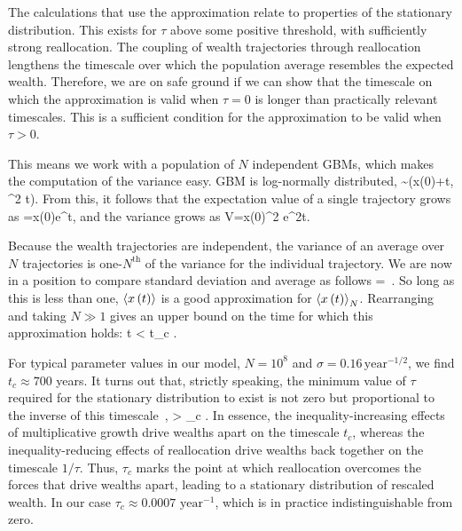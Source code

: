 The calculations that use the approximation relate to properties of the stationary distribution. This exists for $\tau$ above some positive threshold, \ie with sufficiently strong reallocation. The coupling of wealth trajectories through reallocation lengthens the timescale over which the population average resembles the expected wealth. Therefore, we are on safe ground if we can show that the timescale on which the approximation is valid when $\tau=0$ is longer than practically relevant timescales. This is a sufficient condition for the approximation to be valid when $\tau>0$.

This means we work with a population of $N$ independent GBMs, which makes the computation of the variance easy. GBM is log-normally distributed,
\be
\ln{}\sim \ln{}\ln\left(x\left(0\right)+ t, \sigma^2 t\right).
\ee
From this, it follows that the expectation value of a single trajectory grows as
\be
{}=x\left(0\right)e^{\mu t},
\ee
and the variance grows as
\be
V=x\left(0\right)^2 e^{2\mu t}.
\ee

Because the wealth trajectories are independent, the variance of an average over $N$ trajectories is one-$N^{\text{th}}$ of the variance for the individual trajectory.  
We are now in a position to compare standard deviation and average as follows
\be
{} = \,.
\ee
So long as this is less than one, $\left\langle x\left(t\right) \right\rangle$ is a good approximation for $\left\langle x\left(t\right) \right\rangle_N$. Rearranging and taking $N\gg1$ gives an upper bound on the time for which this approximation holds:
\be
t < t_c \equiv {}.
\ee

For typical parameter values in our model, $N=10^8$ and $\sigma=0.16\, \text{year}^{-1/2}$, we find $t_c\approx 700$ years. It turns out that, strictly speaking, the minimum value of $\tau$ required for the stationary distribution to exist is not zero but proportional to the inverse of this timescale~\cite{Bouchaud2015b}, \ie 
\be
\tau > \tau_c \equiv {}.
\ee
In essence, the inequality-increasing effects of multiplicative growth drive wealths apart on the timescale $t_c$, whereas the inequality-reducing effects of reallocation drive wealths back together on the timescale $1/\tau$. Thus, $\tau_c$ marks the point at which reallocation overcomes the forces that drive wealths apart, leading to a stationary distribution of rescaled wealth. In our case $\tau_c\approx 0.0007 \text{ year}^{-1}$, which is in practice indistinguishable from zero.

